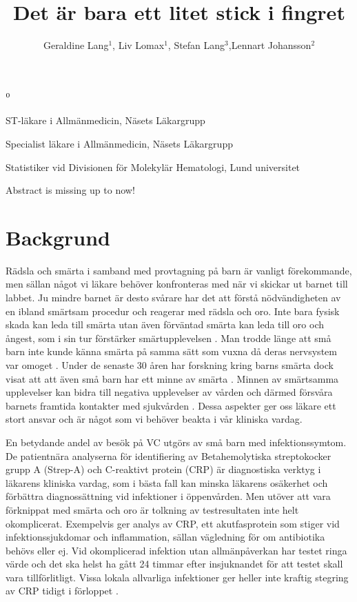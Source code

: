 \documentclass[12pt,twocolumn]{article}
\title{Det är bara ett litet stick i fingret}
\author{Geraldine Lang$^{1}$, Liv Lomax$^1$, Stefan Lang$^3$,Lennart
Johansson$^2$}
\newenvironment{affiliations}{%
    \setcounter{enumi}{1}%
    \setlength{\parindent}{0in}%
    \slshape\sloppy%
    \begin{list}{\upshape$^{\arabic{enumi}}$}{%
        \usecounter{enumi}%
        \setlength{\leftmargin}{0in}%
        \setlength{\topsep}{0in}%
        \setlength{\labelsep}{0in}%
        \setlength{\labelwidth}{0in}%
        \setlength{\listparindent}{0in}%
        \setlength{\itemsep}{0ex}%
        \setlength{\parsep}{0in}%
        }
    }{\end{list}\par\vspace{12pt}}
\renewenvironment{abstract}{%
    \setlength{\parindent}{0in}%
    \setlength{\parskip}{0in}%
    \bfseries%
    }{\par\vspace{-6pt}}
\begin{document}
\onecolumn

\maketitle

\begin{affiliations}
 \item ST-läkare i Allmänmedicin, Näsets Läkargrupp
 \item Specialist läkare i Allmänmedicin, Näsets Läkargrupp
 \item Statistiker vid Divisionen för Molekylär Hematologi, Lund universitet
\end{affiliations}

\begin{abstract}
Abstract is missing up to now!
\end{abstract}


\twocolumn

\newpage

\section{Backgrund}


Rädsla och smärta i samband med provtagning på barn är vanligt
förekommande, men sällan något vi läkare behöver konfronteras med
när vi skickar ut barnet till labbet. Ju mindre barnet är desto svårare
har det att förstå nödvändigheten av en ibland smärtsam procedur och
reagerar med rädsla och oro. Inte bara fysisk skada kan leda till smärta
utan även förväntad smärta kan leda till oro och ångest, som i sin
tur förstärker smärtupplevelsen \cite{Carverius2014}.
Man trodde länge att små barn inte kunde känna smärta på samma
sätt som vuxna då deras nervsystem var omoget \cite{Rey1993}. Under de
senaste 30
åren har forskning kring barns smärta dock visat att att även små
barn har ett minne av smärta \cite{Anand2007,Fitzgerald2001,Schechter2003}.
Minnen av smärtsamma upplevelser kan bidra till negativa upplevelser av
vården och därmed försvåra barnets framtida kontakter med
sjukvården \cite{vBayer2004}. Dessa aspekter ger oss läkare ett stort
ansvar och är något som vi behöver beakta i vår kliniska vardag.

En betydande andel av besök på VC utgörs av små barn med
infektionssymtom. De patientnära analyserna för identifiering av
Betahemolytiska streptokocker grupp A (Strep-A) och C-reaktivt protein (CRP)
är diagnostiska verktyg i läkarens kliniska vardag, som i bästa fall kan
minska läkarens osäkerhet och förbättra diagnossättning vid
infektioner i öppenvården. Men utöver att vara förknippat med smärta
och oro är tolkning av testresultaten inte helt okomplicerat.
Exempelvis ger analys av CRP, ett akutfasprotein som stiger vid
infektionssjukdomar och inflammation, sällan vägledning för om antibiotika
behövs eller ej. Vid okomplicerad infektion utan allmänpåverkan har
testet ringa värde och det ska helst ha gått 24 timmar efter insjuknandet
för att testet skall vara tillförlitligt. Vissa lokala allvarliga
infektioner ger heller inte kraftig stegring av CRP tidigt i förloppet
\cite{Tecken2014}.
\end{document}
